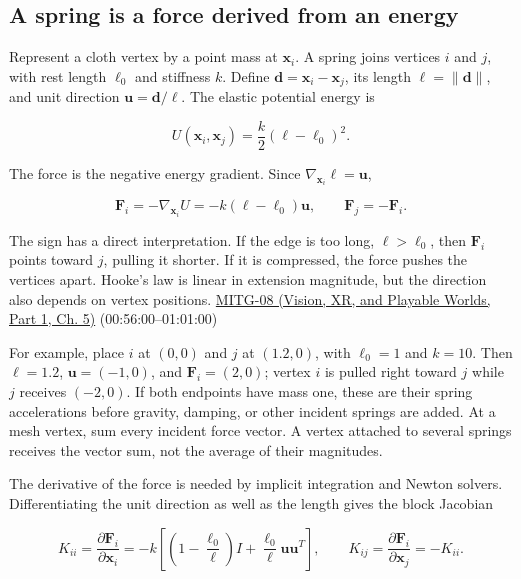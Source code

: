\subsection{A spring is a force derived from an energy}\label{04-visual-computing-ii-ch029-a-spring-is-a-force-derived-from-an-energy}

\hypertarget{04-visual-computing-ii-ch029-a-spring-is-a-force-derived-from-an-energy}{}

Represent a cloth vertex by a point mass at \(\boldsymbol{x}_i\). A spring joins vertices \(i\) and \(j\), with rest length \(\ell_0\) and stiffness \(k\). Define \(\boldsymbol{d}=\boldsymbol{x}_i-\boldsymbol{x}_j\), its length \(\ell=\|\boldsymbol{d}\|\), and unit direction \(\boldsymbol{u}=\boldsymbol{d}/\ell\). The elastic potential energy is

\[
U(\boldsymbol{x}_i,\boldsymbol{x}_j)=\frac{k}{2}(\ell-\ell_0)^2.
\]

The force is the negative energy gradient. Since \(\nabla_{\boldsymbol{x}_i}\ell=\boldsymbol{u}\),

\[
\boldsymbol{F}_i=-\nabla_{\boldsymbol{x}_i}U
=-k(\ell-\ell_0)\boldsymbol{u},\qquad
\boldsymbol{F}_j=-\boldsymbol{F}_i.
\]

The sign has a direct interpretation. If the edge is too long, \(\ell>\ell_0\), then \(\boldsymbol{F}_i\) points toward \(j\), pulling it shorter. If it is compressed, the force pushes the vertices apart. Hooke's law is linear in extension magnitude, but the direction also depends on vertex positions. \href{../07-Vision-XR-and-Playable-Worlds-P01/main.pdf\#nameddest=04-visual-computing-ii-ch036-mitg-08---cloth-simulation}{MITG-08 (Vision, XR, and Playable Worlds, Part 1, Ch. 5)} (00:56:00--01:01:00)

For example, place \(i\) at \((0,0)\) and \(j\) at \((1.2,0)\), with \(\ell_0=1\) and \(k=10\). Then \(\ell=1.2\), \(\boldsymbol{u}=(-1,0)\), and \(\boldsymbol{F}_i=(2,0)\); vertex \(i\) is pulled right toward \(j\) while \(j\) receives \((-2,0)\). If both endpoints have mass one, these are their spring accelerations before gravity, damping, or other incident springs are added. At a mesh vertex, sum every incident force vector. A vertex attached to several springs receives the vector sum, not the average of their magnitudes.

The derivative of the force is needed by implicit integration and Newton solvers. Differentiating the unit direction as well as the length gives the block Jacobian

\[
K_{ii}=\frac{\partial\boldsymbol{F}_i}{\partial\boldsymbol{x}_i}
=-k\left[\left(1-\frac{\ell_0}{\ell}\right)I
+\frac{\ell_0}{\ell}\boldsymbol{u}\boldsymbol{u}^{T}\right],
\qquad
K_{ij}=\frac{\partial\boldsymbol{F}_i}{\partial\boldsymbol{x}_j}=-K_{ii}.
\]

